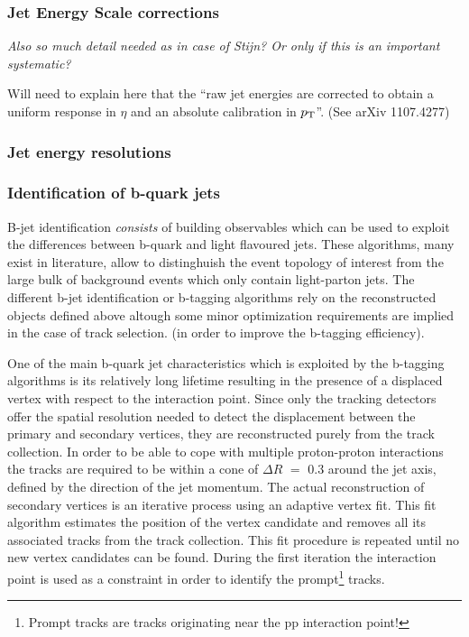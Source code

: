 \subsubsection*{Jet Energy Scale corrections}
\textit{Also so much detail needed as in case of Stijn? Or only if this is an important systematic?}

Will need to explain here that the ``raw jet energies are corrected to obtain a uniform response in $\eta$ and an absolute calibration in $p_{\rm T}$''. (See arXiv 1107.4277)

\subsubsection*{Jet energy resolutions}

\subsubsection*{Identification of b-quark jets}

B-jet identification \textit{consists} of building observables which can be used to exploit the differences between b-quark and light flavoured jets. These algorithms, many exist in literature, allow to distinghuish the event topology of interest from the large bulk of background events which only contain light-parton jets.
The different b-jet identification or b-tagging algorithms rely on the reconstructed objects defined above altough some minor optimization requirements are implied in the case of track selection. (in order to improve the b-tagging efficiency).

One of the main b-quark jet characteristics which is exploited by the b-tagging algorithms is its relatively long lifetime resulting in the presence of a displaced vertex with respect to the interaction point. Since only the tracking detectors offer the spatial resolution needed to detect the displacement between the primary and secondary vertices, they are reconstructed purely from the track collection. In order to be able to cope with multiple proton-proton interactions the tracks are required to be within a cone of $\Delta R$ $=$ $0.3$ around the jet axis, defined by the direction of the jet momentum. 
The actual reconstruction of secondary vertices is an iterative process using an adaptive vertex fit. This fit algorithm estimates the position of the vertex candidate and removes all its associated tracks from the track collection. This fit procedure is repeated until no new vertex candidates can be found. During the first iteration the interaction point is used as a constraint in order to identify the prompt\footnote{Prompt tracks are tracks originating near the pp interaction point!} tracks.

